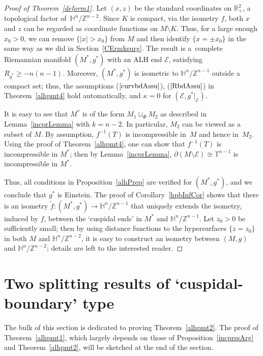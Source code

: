 \documentclass[10pt,a4paper]{amsart}
\numberwithin{equation}{section}
\def\R{\mathbb{R}}
\def\H{\mathbb{H}}
\def\T{\mathbb{T}}
\def\Z{\mathbb{Z}}
\def\Ecal{\mathcal{E}}
\begin{document}
\begin{proof}[Proof of Theorem~\ref{deform1}]
Let $(x,z)$ be the standard coordinates on $\R^2_+$, a topological factor of~$\H^n/\Z^{n-2}$. Since $K$ is compact, via the isometry $f$,
both $x$ and $z$ can be regarded as coordinate functions on $M\setminus K$. Thus, for a large enough $x_0>0$, we can
remove $\{|x|>x_0\}$ from $M$ and then identify $\{x = \pm x_0\}$ in the same way
as we did in Section~\ref{CErmksurg}. The result is a~complete Riemannian manifold $(M^*,g^*)$
with an ALH end $\Ecal$, satisfying $R_{g^*}\ge -n(n-1)$. Moreover, $(M^*, g^*)$ is isometric to $\H^n/\Z^{n-1}$ outside a compact set; thus,
the assumptions ($\ref{curvbdAssu}$), ($\ref{RbdAssu}$) in Theorem~\ref{alhpmt4} hold automatically, and
$\kappa = 0$ for $(\Ecal, g^*|_\Ecal)$.

It is easy to see that $M^*$ is of the form $M_1\sqcup_\Phi M_2$ as
described in Lemma~\ref{incprLemma}
with $k = n-2$. In particular, $M_2$ can be viewed as a subset of $M$.
By assumption, $f^{-1}(T)$ is incompressible in~$M$ and hence in~$M_2$.
Using the proof of Theorem~\ref{alhpmt4}, one can show that $f^{-1}(T)$ is incompressible in $M^*$;
then by Lemma~\ref{incprLemma}, $\partial (M\setminus\Ecal)\cong\T^{n-1}$ is incompressible
in $M^*$.

Thus, all conditions in Proposition~\ref{alhPrep} are verified for $(M^*, g^*)$, and we conclude that $g^*$ is Einstein.
The proof of Corollary~\ref{hpbInfCor} shows that there is an isometry
$\tilde f\colon (M^*, g^*)\rightarrow \H^n/\Z^{n-1}$ that uniquely extends the isometry, induced by $f$, between the `cuspidal ends'
in $M^*$ and $\H^n/\Z^{n-1}$.
Let $z_0>0$ be sufficiently small; then by using distance functions to the hypersurfaces
$\{z = z_0\}$ in both $M$ and $\H^n/\Z^{n-2}$, it is easy to
construct an isometry between $(M,g)$ and $\H^n/\Z^{n-2}$; details are
left to the interested reader.
\end{proof}


\section{Two splitting results of `cuspidal-boundary' type}\label{Two_splitting}
The bulk of this section is dedicated to proving Theorem~\ref{alhpmt2}.
The proof of
Theorem~\ref{alhpmt1}, which largely depends on those of Proposition~\ref{incprssArg}
and Theorem~\ref{alhpmt2},
will be sketched at the end
of the section.
\end{document}
